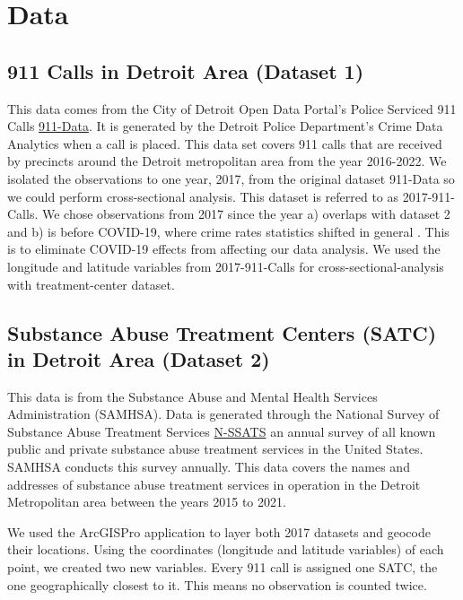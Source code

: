\documentclass[12pt]{article}
\begin{document}
\section{Data}
\label{sec:data}

\subsection{911 Calls in Detroit Area (Dataset 1)}

This data comes from the City of Detroit Open Data Portal's Police Serviced 911 Calls  \href{https://data.detroitmi.gov/datasets/detroitmi::police-serviced-911-calls/about}{911-Data}. It is generated by the Detroit Police Department's Crime Data Analytics when a call is placed. This data set covers 911 calls that are received by precincts around the Detroit metropolitan area from the year 2016-2022. We isolated the observations to one year, 2017, from the original dataset 911-Data so we could perform cross-sectional analysis. This dataset is referred to as 2017-911-Calls. We chose observations from 2017 since the year a) overlaps with dataset 2 and b) is before COVID-19, where crime rates statistics shifted in general \cite{covid_and_crime}. This is to eliminate COVID-19 effects from affecting our data analysis. We used the longitude and latitude variables from 2017-911-Calls for cross-sectional-analysis with treatment-center dataset.

\subsection{Substance Abuse Treatment Centers (SATC) in Detroit Area (Dataset 2)}

This data is from the Substance Abuse and Mental Health Services Administration (SAMHSA). Data is generated through the National Survey of Substance Abuse Treatment Services \href{https://www.samhsa.gov/data/data-we-collect/n-ssats-national-survey-substance-abuse-treatment-services}{N-SSATS} an annual survey of all known public and private substance abuse treatment services in the United States. SAMHSA conducts this survey annually. This data covers the names and addresses of substance abuse treatment services in operation in the Detroit Metropolitan area between the years 2015 to 2021. 


We used the ArcGISPro application to layer both 2017 datasets and geocode their locations. Using the coordinates (longitude and latitude variables) of each point, we created two new variables. Every 911 call is assigned one SATC, the one geographically closest to it. This means no observation is counted twice. 
\end{document}
